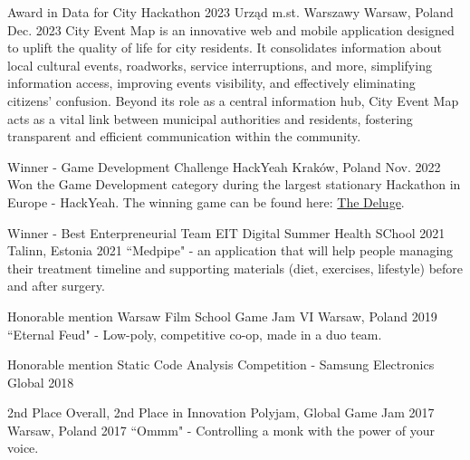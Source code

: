 
\begin{cvhonors}

\cvhonor
    {Award in Data for City Hackathon 2023} %
    {Urząd m.st. Warszawy} %
    {Warsaw, Poland} %
    {Dec. 2023} %
\cvhonordet %
    {}
    {City Event Map is an innovative web and mobile application designed to uplift the quality of life for city residents. It consolidates information about local cultural events, roadworks, service interruptions, and more, simplifying information access, improving events visibility, and effectively eliminating citizens' confusion. Beyond its role as a central information hub, City Event Map acts as a vital link between municipal authorities and residents, fostering transparent and efficient communication within the community.} %
    {}

\cvhonor
    {Winner - Game Development Challenge} %
	{HackYeah} %
	{Kraków, Poland} %
	{Nov. 2022} %
\cvhonordet %
	{}
	{Won the Game Development category during the largest stationary Hackathon in Europe - HackYeah. The winning game can be found here: \href{https://hist0r.itch.io/the-deluge}{The Deluge}.} %
	{}

  \cvhonor
    {Winner - Best Enterpreneurial Team} %
    {EIT Digital Summer Health SChool 2021} %
    {Talinn, Estonia} %
    {2021} %
  \cvhonordet %
    {}
    {``Medpipe" - an application that will help people managing their treatment timeline and supporting materials (diet, exercises, lifestyle) before and after surgery. } %
    {}
    {}

  \cvhonor
    {Honorable mention} %
    {Warsaw Film School Game Jam VI} %
    {Warsaw, Poland} %
    {2019} %
  \cvhonordet %
    {}
    {``Eternal Feud" - Low-poly, competitive co-op, made in a duo team. } %
    {}
    {}

  \cvhonor
    {Honorable mention} %
    {Static Code Analysis Competition - Samsung Electronics} %
    {Global} %
    {2018} %

  \cvhonor
    {2nd Place Overall, 2nd Place in Innovation} %
    {Polyjam, Global Game Jam 2017} %
    {Warsaw, Poland} %
    {2017} %
  \cvhonordet %
    {}
    {``Ommm" - Controlling a monk with the power of your voice. } %
    {}
    {}

\end{cvhonors}
